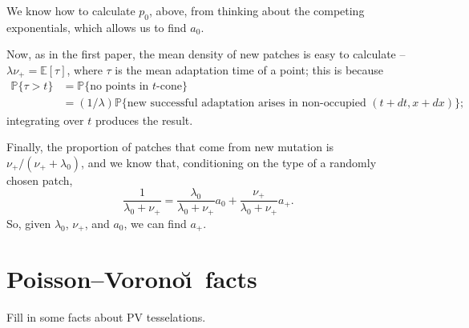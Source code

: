\documentclass{article}
\renewcommand{\P}{\mathbb{P}}
\newcommand{\E}{\mathbb{E}}
\begin{document}
We know how to calculate $p_0$, above, from thinking about the competing exponentials,
which allows us to find $a_0$.

Now, as in the first paper, the mean density of new patches is easy to calculate -- 
$\lambda \nu_+ = \E[\tau]$, where $\tau$ is the mean adaptation time of a point;
this is because 
\begin{align*}
    \P\{ \tau > t \} &= \P\{ \mbox{no points in $t$-cone} \} \\
            &= (1/\lambda) \P\{ \mbox{new successful adaptation arises in non-occupied $(t+dt,x+dx)$} \} ;
\end{align*}
integrating over $t$ produces the result.

Finally, the proportion of patches that come from new mutation is $\nu_+ / (\nu_+ + \lambda_0)$,
and we know that, conditioning on the type of a randomly chosen patch,
\[
    \frac{1}{\lambda_0+\nu_+} = \frac{\lambda_0}{\lambda_0+\nu_+} a_0 + \frac{\nu_+}{\lambda_0+\nu_+} a_+ .
\]
So, given $\lambda_0$, $\nu_+$, and $a_0$, we can find $a_+$.


\section{Poisson--Vorono\u\i\ facts}

Fill in some facts about PV tesselations.
\end{document}
